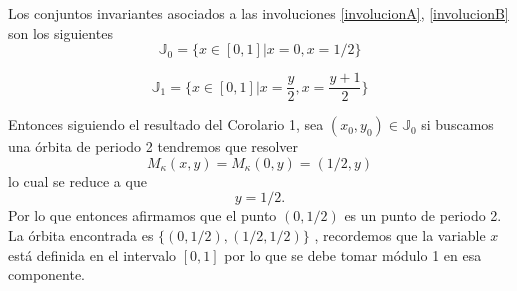 Los conjuntos invariantes asociados a las involuciones \eqref{involucionA}, \eqref{involucionB} son los siguientes
\begin{equation}
\mathbb{J}_{0} = \{ x \in [0,1] |x=0, x=1/2\}
\label{invariantejA}
\end{equation}

\begin{equation}
\mathbb{J}_{1} = \{ x \in [0,1] |x=\frac{y}{2}, x=\frac{y+1}{2}\}
\label{invariantejB}
\end{equation}

Entonces siguiendo el resultado del Corolario 1, sea $(x_{0},y_{0})\in \mathbb{J}_{0}$ si buscamos una \'orbita de periodo 2 tendremos que resolver 
\begin{equation*}
M_{\kappa}(x,y) = M_{\kappa}(0,y)=(1/2,y)
\end{equation*}
lo cual se reduce a que
\begin{equation*}
y=1/2.
\end{equation*}
Por lo que entonces afirmamos que el punto $(0,1/2)$ es un punto de periodo 2. La \'orbita encontrada es $\{(0,1/2), (1/2,1/2)\}$ , recordemos que la variable $x$ est\'a definida en el intervalo $[0,1]$ por lo que se debe tomar m\'odulo 1 en esa componente. \\

